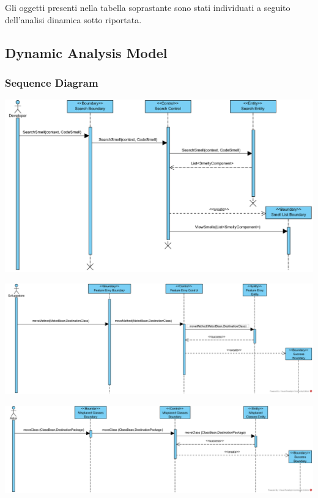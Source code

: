 \documentclass[11pt]{article}
\begin{document}
	    		\vspace{0.5cm}
				
				Gli oggetti presenti nella tabella soprastante sono stati individuati a seguito dell'analisi dinamica sotto riportata. 
				    		
	    		\vspace{0.5cm}
	    \subsection{Dynamic Analysis Model}
	    
	    	
	    	
    	\subsubsection{Sequence Diagram}
    	
    		\includegraphics[width=\columnwidth]{AnalisiCurrentProposed.png}
    	    		    	
    		\includegraphics[width=\columnwidth]{Feature_Envy.png}
    		
    		\includegraphics[width=\columnwidth]{SD_Misplaced_Classes.png}
    	
\end{document}

